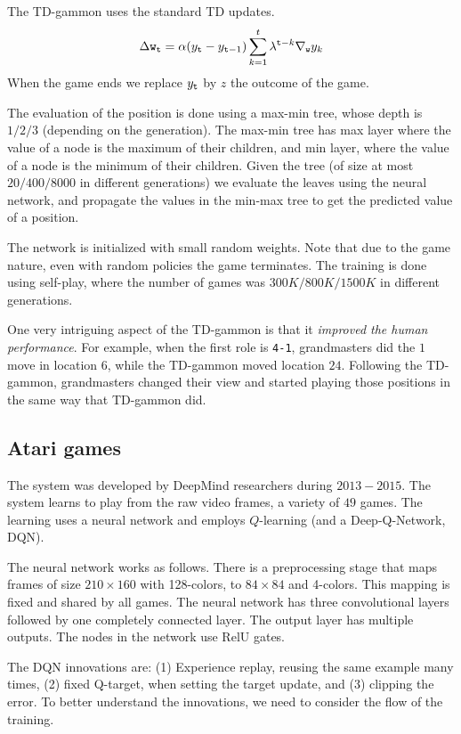 The TD-gammon uses the standard TD updates.
\[
\Delta {\tt w}_{\tt t} =
\alpha(y_{\tt t}-y_{{\tt t}-1})\sum_{k=1}^{t}\lambda^{{\tt t}-k}\nabla_{\tt w}
y_k
\]
When the game ends we replace $y_{\tt t}$ by $z$ the outcome of the
game.



The evaluation of the position is done using a max-min tree, whose
depth is $1/2/3$ (depending on the generation). The max-min tree has max layer where the value of
a node is the maximum of their children, and min layer, where the
value of a node is the minimum of their children. Given the tree (of
size at most $20/400/8000$ in different generations) we evaluate the
leaves using the neural network, and propagate the values in the
min-max tree to get the predicted value of a position.

The network is initialized with small random weights. Note that due
to the game nature, even with random policies the game terminates.
The training is done using self-play, where the number of games was
$300K/800K/1500K$ in different generations.

One very intriguing aspect  of the TD-gammon is that it {\em
improved the human performance}. For example, when the first role is
{\tt 4-1}, grandmasters did the $1$ move in location $6$, while the
TD-gammon moved location $24$. Following the TD-gammon, grandmasters
changed their view and started playing those positions in the same
way that TD-gammon did.

\subsection{Atari games}

The system was developed by DeepMind researchers during $2013-2015$.
The system learns to play from the raw video frames, a variety of
$49$ games. The learning uses a neural network and employs
$Q$-learning (and a Deep-Q-Network, DQN).

The neural network works as follows. There is a preprocessing stage
that maps frames of size $210\times 160$ with 128-colors, to
$84\times 84$ and 4-colors. This mapping is fixed and shared by all
games. The neural network has three convolutional layers followed by
one completely connected layer. The output layer has multiple
outputs. The nodes in the network use RelU gates.

The DQN innovations are: (1) Experience replay, reusing the same
example many times, (2) fixed Q-target, when setting the target
update, and (3) clipping the error. To better understand the
innovations, we need to consider the flow of the training.


